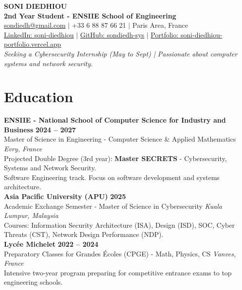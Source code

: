 \documentclass[10pt, a4paper]{article}
\begin{document}
\begin{center}
    {\Huge \bfseries SONI DIEDHIOU} \\
    \vspace{4pt}
    {\large \bfseries 2nd Year Student - ENSIIE School of Engineering} \\
    \vspace{6pt}
    \small
    \href{mailto:sondiedh@gmail.com}{sondiedh@gmail.com} $|$ +33 6 88 87 66 21 $|$ Paris Area, France \\
    \vspace{2pt}
    \href{https://www.linkedin.com/in/soni-diedhiou-30b291348}{LinkedIn: soni-diedhiou} $|$ 
    \href{https://github.com/sondiedh-sys}{GitHub: sondiedh-sys} $|$ 
    \href{https://soni-diedhiou-portfolio.vercel.app}{Portfolio: soni-diedhiou-portfolio.vercel.app} \\
    \vspace{4pt}
    \textit{Seeking a Cybersecurity Internship (May to Sept) | Passionate about computer systems and network security.}
\end{center}

\section{Education}
\textbf{ENSIIE - National School of Computer Science for Industry and Business} \hfill \textbf{2024 -- 2027} \\
Master of Science in Engineering - Computer Science \& Applied Mathematics \hfill \textit{Evry, France} \\
Projected Double Degree (3rd year): \textbf{Master SECRETS} - Cybersecurity, Systems and Network Security. \\
Software Engineering track. Focus on software development and systems architecture. \\

\vspace{4pt}
\textbf{Asia Pacific University (APU)} \hfill \textbf{2025} \\
Academic Exchange Semester - Master of Science in Cybersecurity \hfill \textit{Kuala Lumpur, Malaysia} \\
Courses: Information Security Architecture (ISA), Design (ISD), SOC, Cyber Threats (CST), Network Design Performance (NDP). \\

\vspace{4pt}
\textbf{Lycée Michelet} \hfill \textbf{2022 -- 2024} \\
Preparatory Classes for Grandes Écoles (CPGE) - Math, Physics, CS \hfill \textit{Vanves, France} \\
Intensive two-year program preparing for competitive entrance exams to top engineering schools. \\
\end{document}
